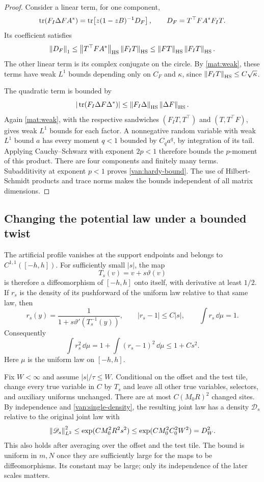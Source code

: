 \begin{proof}
Consider a linear term, for one component,
\[
 \operatorname{tr}(F_I\Delta F A^*)
 =\operatorname{tr}\!\left[z(1-zB)^{-1}D_F\right],
 \qquad D_F=T^\top F A^*F_I T.
\]
Its coefficient satisfies
\[
 \left\lVert D_F\right\rVert_1
 \leq\left\lVert T^\top F A^*\right\rVert_{\mathrm{HS}}
       \left\lVert F_I T\right\rVert_{\mathrm{HS}}
 \leq\left\lVert FT\right\rVert_{\mathrm{HS}}
       \left\lVert F_I T\right\rVert_{\mathrm{HS}}.
\]
The other linear term is its complex conjugate on the circle.
By \cref{mat:weak}, these terms have weak $L^1$ bounds depending
only on $C_F$ and $\kappa$, since
$\left\lVert F_I T\right\rVert_{\mathrm{HS}}\leq C\sqrt\kappa$.

The quadratic term is bounded by
\[
 |\operatorname{tr}(F_I\Delta F\Delta^*)|
 \leq\left\lVert F_I\Delta\right\rVert_{\mathrm{HS}}
       \left\lVert\Delta F\right\rVert_{\mathrm{HS}}.
\]
Again \cref{mat:weak}, with the respective sandwiches
$(F_I T,T^\top)$ and $(T,T^\top F)$, gives weak $L^1$ bounds for
each factor. A nonnegative random variable with weak $L^1$ bound
$a$ has every moment $q<1$ bounded by $C_q a^q$, by integration
of its tail. Applying Cauchy--Schwarz with exponent $2p<1$ therefore
bounds the $p$-moment of this product. There are four components and
finitely many terms. Subadditivity at exponent $p<1$ proves
\cref{van:hardy-bound}. The use of Hilbert-Schmidt products and
trace norms makes the bounds independent of all matrix dimensions.
\end{proof}

\subsection{Changing the potential law under a bounded twist}

The artificial profile vanishes at the support endpoints and belongs
to $C^{1,1}([-h,h])$. For sufficiently small $|s|$, the map
\[
 T_s(v)=v+s\vartheta(v)
\]
is therefore a diffeomorphism of $[-h,h]$ onto itself, with derivative
at least $1/2$. If $r_s$ is the density of its pushforward of the
uniform law relative to that same law, then
\[
 r_s(y)=\frac{1}{1+s\vartheta'(T_s^{-1}(y))},
 \qquad |r_s-1|\leq C|s|,\qquad \int r_s\,\dd\mu=1.
\]
Consequently
\begin{equation}\label{van:single-density}
 \int r_s^2\,\dd\mu
 =1+\int(r_s-1)^2\,\dd\mu\leq1+Cs^2.
\end{equation}
Here $\mu$ is the uniform law on $[-h,h]$.

Fix $W<\infty$ and assume $|s|/\tau\leq W$. Conditional on the
offset and the test tile, change every true variable in $C$ by $T_s$
and leave all other true variables, selectors, and auxiliary uniforms
unchanged. There are at most $C(M_0R)^2$ changed sites. By independence
and \cref{van:single-density}, the resulting joint law has a density
$\mathscr D_s$ relative to the original joint law with
\begin{equation}\label{van:joint-density}
 \left\lVert\mathscr D_s\right\rVert_{L^2}^2
 \leq \exp(CM_0^2R^2s^2)
 \leq \exp(CM_0^2C_0^2W^2)=D_W^2.
\end{equation}
This also holds after averaging over the offset and the test tile.
The bound is uniform in $m,N$ once they are sufficiently large for
the maps to be diffeomorphisms. Its constant may be large; only its
independence of the later scales matters.

